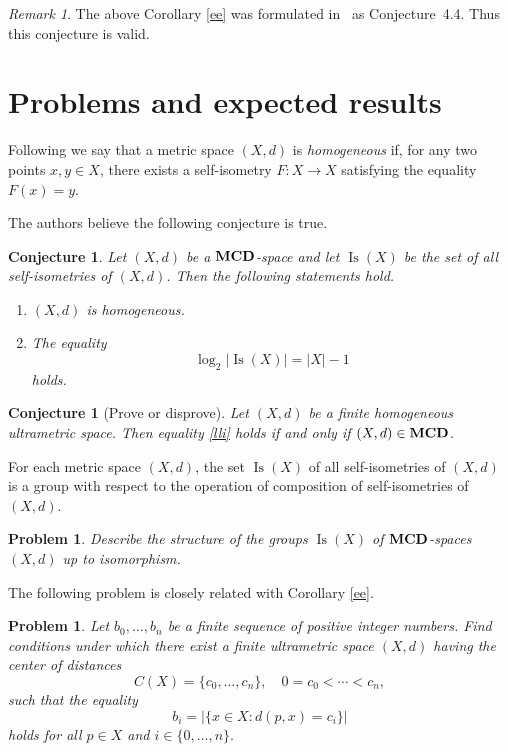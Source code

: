 \documentclass{raex}
\newtheorem{prob}[thm]{Problem}
\newtheorem{con}[thm]{Conjecture}
\theoremstyle{definition}
\theoremstyle{remark}
\newtheorem{rem}[thm]{Remark}
\numberwithin{equation}{section}
\begin{document}
\begin{rem} The above Corollary \ref{ee} was formulated in~\cite{DovgosheyRovenska2026} as Conjecture~4.4.
Thus this conjecture is valid.
\end{rem}



\section{Problems and expected results}\label{seq5}

Following \cite[p.~38]{Dez-Dez} we say that a metric space $(X,d)$ is {\it homogeneous} if, for any two points $x,y\in X$, there exists a self-isometry $F : X \to X$ satisfying the equality $F(x)=y$.

The authors believe the following conjecture is true.

\begin{con}\label{llp} Let $(X,d)$ be a ${\bf MCD}$-space and let $\operatorname{Is}(X)$ be the set of all self-isometries of $(X,d)$. Then the following statements hold.
\begin{enumerate}
    \item[(i)] $(X,d)$ is homogeneous.
    \item[(ii)] The equality
    \begin{equation}
        \label{lli}
      \log_2  |\operatorname{Is}(X)| = |X|-1
        \end{equation}
    holds.
\end{enumerate}
\end{con}


\begin{con}[Prove or disprove]
Let $(X,d)$ be a finite homogeneous ultrametric space. Then equality \eqref{lli} holds if and only if $(X,d)\in {\bf MCD}$.
\end{con}

For each metric space $(X,d)$, the set $\operatorname{Is}(X)$ of all self-isometries of $(X,d)$ is a group with respect to the operation of composition of self-isometries of $(X,d)$.

\begin{prob}
    \label{gapl}
Describe the structure of the groups $\operatorname{Is}(X)$ of ${\bf MCD}$-spaces $(X,d)$ up to isomorphism.
\end{prob}



The following problem is closely related with Corollary \ref{ee}.

\begin{prob}
Let $b_0,\ldots,b_n$ be a finite sequence of positive integer numbers. Find conditions under which there exist a finite ultrametric space $(X,d)$ having the center of distances
\[
C(X)=\{c_0,\ldots,c_n\}, \quad 0=c_0<\cdots<c_n,
\]
such that the equality
\begin{equation}
    \label{gaplll}
b_i=\left|\{x\in X:d(p,x)=c_i\}\right|
\end{equation}
holds for all $p\in X$ and $i\in\{0,\ldots,n\}.$
\end{prob}
\end{document}
